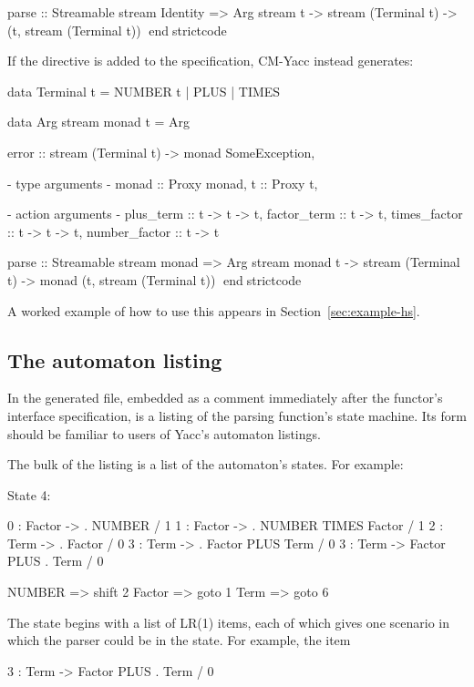 \documentclass[10pt]{article}
\begin{document}
\begin{strictcode}
\begin{strictcode}
\begin{strictcode}
\begin{strictcode}
\begin{strictcode}
\begin{strictcode}
\begin{strictcode}
\begin{strictcode}
\begin{strictcode}
\begin{strictcode}
parse :: Streamable stream Identity 
         => Arg stream t -> stream (Terminal t) -> (t, stream (Terminal t))
endstrictcode

If the  directive is added to the specification, CM-Yacc
instead generates:

\begin{strictcode}
data Terminal t =
   NUMBER t
 | PLUS
 | TIMES

data Arg stream monad t =
   Arg { error :: stream (Terminal t) -> monad SomeException,

         {- type arguments -}
         monad :: Proxy monad,
         t :: Proxy t,

         {- action arguments -}
         plus_term :: t -> t -> t,
         factor_term :: t -> t,
         times_factor :: t -> t -> t,
         number_factor :: t -> t }

parse :: Streamable stream monad 
         => Arg stream monad t 
               -> stream (Terminal t) -> monad (t, stream (Terminal t))
endstrictcode

A worked example of how to use this appears in
Section~\ref{sec:example-hs}.



\subsection{The automaton listing}

In the generated file, embedded as a comment immediately after the
functor's interface specification, is a listing of the parsing
function's state machine.  Its form should be familiar to users of
Yacc's automaton listings.

The bulk of the listing is a list of the automaton's states.  For
example:

\begin{code}
State 4:

0 : Factor -> . NUMBER  / 1
1 : Factor -> . NUMBER TIMES Factor  / 1
2 : Term -> . Factor  / 0
3 : Term -> . Factor PLUS Term  / 0
3 : Term -> Factor PLUS . Term  / 0

NUMBER => shift 2
Factor => goto 1
Term => goto 6
\end{code}

The state begins with a list of LR(1) items, each of which gives one
scenario in which the parser could be in the state.  For example, the
item

\begin{code}
3 : Term -> Factor PLUS . Term  / 0
\end{code}


\end{strictcode}
\end{strictcode}
\end{strictcode}
\end{strictcode}
\end{strictcode}
\end{strictcode}
\end{strictcode}
\end{strictcode}
\end{strictcode}
\end{strictcode}
\end{strictcode}
\end{document}
